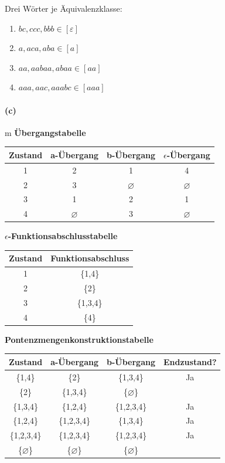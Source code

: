 	Drei Wörter je Äquivalenzklasse:
	\begin{enumerate}
		\item $bc, ccc, bbb \in [\varepsilon]$
		\item $a, aca, aba \in [a]$
		\item $aa, aabaa, abaa \in [aa]$
		\item $aaa, aac, aaabc \in [aaa]$
	\end{enumerate}
	\vspace{0.3cm}
	
\paragraph{(c)}m 
	\textbf{Übergangstabelle}
	
	\begin{tabular}{|c|c|c|c|}
		\hline
		\textbf{Zustand}  & \textbf{a-Übergang} & \textbf{b-Übergang} & \textbf{$\epsilon$-Übergang} \\
		\hline
		1                 & 2                   & 1                   & 4 \\
		\hline
		2                 & 3                   & $\varnothing$       & $\varnothing$ \\
		\hline
		3                 & 1                   & 2                   & 1 \\
		\hline
		4                 & $\varnothing$       & 3                   & $\varnothing$ \\
		\hline
	\end{tabular}
	
	
	\textbf{$\epsilon$-Funktionsabschlusstabelle}
		
	\begin{tabular}{|c|c|}
		\hline
		\textbf{Zustand}  & \textbf{Funktionsabschluss} \\
		\hline
		1                 & \{1,4\} \\
		\hline
		2                 & \{2\} \\
		\hline
		3                 & \{1,3,4\}  \\
		\hline
		4                 & \{4\} \\
		\hline
	\end{tabular}
	
	\textbf{Pontenzmengenkonstruktionstabelle}
	
	\begin{tabular}{|c|c|c|c|}
		\hline
		\textbf{Zustand} & \textbf{a-Übergang} & \textbf{b-Übergang} & \textbf{Endzustand?} \\
		\hline
		\{1,4\}     & \{2\}       & \{1,3,4\}         & Ja \\
		\hline
		\{2\}       & \{1,3,4\}   & \{$\varnothing$\} &    \\
		\hline
		\{1,3,4\}   & \{1,2,4\}   & \{1,2,3,4\}       & Ja \\
		\hline
		\{1,2,4\}   & \{1,2,3,4\} & \{1,3,4\}         & Ja \\
		\hline
		\{1,2,3,4\} & \{1,2,3,4\} & \{1,2,3,4\}       & Ja \\
		\hline
		\{$\varnothing$\}       & \{$\varnothing$\}   & \{$\varnothing$\} &    \\
		\hline
	\end{tabular}	
	
